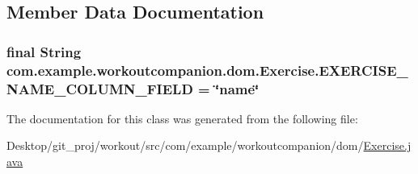 \subsection{Member Data Documentation}
\hypertarget{classcom_1_1example_1_1workoutcompanion_1_1dom_1_1_exercise_a1aeb9a6e42c38c3169197b37e8ee79f8}{
\subsubsection[{E\-X\-E\-R\-C\-I\-S\-E\-\_\-\-N\-A\-M\-E\-\_\-\-C\-O\-L\-U\-M\-N\-\_\-\-F\-I\-E\-L\-D}]{\setlength{\rightskip}{0pt plus 5cm}final String com.\-example.\-workoutcompanion.\-dom.\-Exercise.\-E\-X\-E\-R\-C\-I\-S\-E\-\_\-\-N\-A\-M\-E\-\_\-\-C\-O\-L\-U\-M\-N\-\_\-\-F\-I\-E\-L\-D = \char`\"{}name\char`\"{}\hspace{0.3cm}{\ttfamily [static]}}}\label{classcom_1_1example_1_1workoutcompanion_1_1dom_1_1_exercise_a1aeb9a6e42c38c3169197b37e8ee79f8}


The documentation for this class was generated from the following file\-:\begin{DoxyCompactItemize}
\item 
Desktop/git\-\_\-proj/workout/src/com/example/workoutcompanion/dom/\hyperlink{_exercise_8java}{Exercise.\-java}\end{DoxyCompactItemize}
